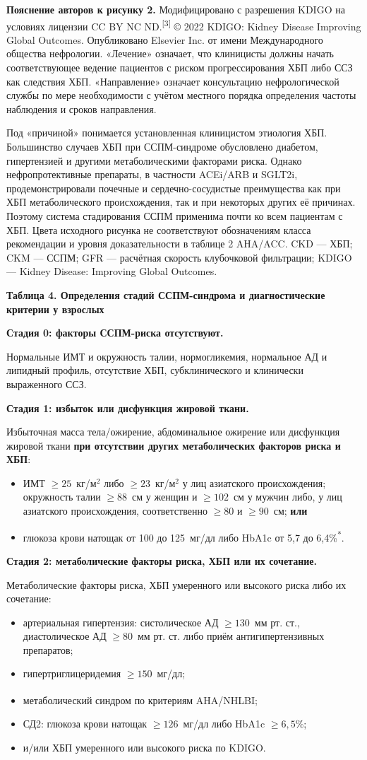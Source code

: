 \documentclass[11pt,a4paper]{article}
\newcommand{\src}[1]{\textsuperscript{[#1]}}
\newcommand{\heading}[1]{\par\medskip\textbf{#1}\par}
\begin{document}
\textbf{Пояснение авторов к рисунку 2.} Модифицировано с разрешения KDIGO на условиях лицензии CC BY NC ND.\src{3} © 2022 KDIGO: Kidney Disease Improving Global Outcomes. Опубликовано Elsevier Inc. от имени Международного общества нефрологии. «Лечение» означает, что клиницисты должны начать соответствующее ведение пациентов с риском прогрессирования ХБП либо ССЗ как следствия ХБП. «Направление» означает консультацию нефрологической службы по мере необходимости с учётом местного порядка определения частоты наблюдения и сроков направления.

Под «причиной» понимается установленная клиницистом этиология ХБП. Большинство случаев ХБП при ССПМ-синдроме обусловлено диабетом, гипертензией и другими метаболическими факторами риска. Однако нефропротективные препараты, в частности ACEi/ARB и SGLT2i, продемонстрировали почечные и сердечно-сосудистые преимущества как при ХБП метаболического происхождения, так и при некоторых других её причинах. Поэтому система стадирования ССПМ применима почти ко всем пациентам с ХБП. Цвета исходного рисунка не соответствуют обозначениям класса рекомендации и уровня доказательности в таблице 2 AHA/ACC. CKD --- ХБП; CKM --- ССПМ; GFR --- расчётная скорость клубочковой фильтрации; KDIGO --- Kidney Disease: Improving Global Outcomes.

\heading{Таблица 4. Определения стадий ССПМ-синдрома и диагностические критерии у взрослых}
\heading{Стадия 0: факторы ССПМ-риска отсутствуют.} Нормальные ИМТ и окружность талии, нормогликемия, нормальное АД и липидный профиль, отсутствие ХБП, субклинического и клинически выраженного ССЗ.

\heading{Стадия 1: избыток или дисфункция жировой ткани.} Избыточная масса тела/ожирение, абдоминальное ожирение или дисфункция жировой ткани \textbf{при отсутствии других метаболических факторов риска и ХБП}:
\begin{itemize}
\item ИМТ $\geq25$~кг/м$^2$ либо $\geq23$~кг/м$^2$ у лиц азиатского происхождения; окружность талии $\geq88$~см у женщин и $\geq102$~см у мужчин либо, у лиц азиатского происхождения, соответственно $\geq80$ и $\geq90$~см; \textbf{или}
\item глюкоза крови натощак от 100 до 125~мг/дл либо HbA1c от 5,7 до 6,4\%\textsuperscript{*}.
\end{itemize}

\heading{Стадия 2: метаболические факторы риска, ХБП или их сочетание.} Метаболические факторы риска, ХБП умеренного или высокого риска либо их сочетание:
\begin{itemize}
\item артериальная гипертензия: систолическое АД $\geq130$~мм рт. ст., диастолическое АД $\geq80$~мм рт. ст. либо приём антигипертензивных препаратов;
\item гипертриглицеридемия $\geq150$~мг/дл;
\item метаболический синдром по критериям AHA/NHLBI\textsuperscript{\dag};
\item СД2: глюкоза крови натощак $\geq126$~мг/дл либо HbA1c $\geq6{,}5\%$;
\item и/или ХБП умеренного или высокого риска по KDIGO.
\end{itemize}
\end{document}
